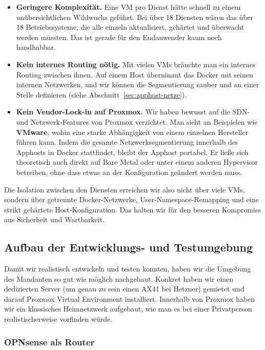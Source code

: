 \begin{itemize}
  \item \textbf{Geringere Komplexität.} Eine \ac{VM} pro Dienst hätte schnell zu
    einem unübersichtlichen Wildwuchs geführt. Bei über 18 Diensten wären
    das über 18 Betriebssysteme, die alle einzeln aktualisiert, gehärtet und
    überwacht werden müssten. Das ist gerade für den Endanwender kaum noch
    handhabbar.
  \item \textbf{Kein internes Routing nötig.} Mit vielen \acp{VM} bräuchte man ein
    internes Routing zwischen ihnen. Auf einem Host übernimmt das Docker mit
    seinen internen Netzwerken, und wir können die Segmentierung sauber und an
    einer Stelle definieren (siehe Abschnitt~\ref{sec:apphost-netze}).
  \item \textbf{Kein Vendor-Lock-in auf Proxmox.} Wir haben bewusst auf die
    \ac{SDN}- und Netzwerk-Features von Proxmox verzichtet. Man sieht an Beispielen
    wie \textbf{VMware}, wohin eine starke Abhängigkeit von einem einzelnen Hersteller
    führen kann. Indem die gesamte Netzwerksegmentierung innerhalb des Apphosts
    in Docker stattfindet, bleibt der Apphost portabel. Er ließe sich theoretisch
    auch direkt auf Bare Metal oder unter einem anderen Hypervisor betreiben, ohne
    dass etwas an der Konfiguration geändert werden muss.
\end{itemize}

Die Isolation zwischen den Diensten erreichen wir also nicht über viele \acp{VM},
sondern über getrennte Docker-Netzwerke, User-Namespace-Remapping und eine
strikt gehärtete Host-Konfiguration. Das halten wir für den besseren
Kompromiss aus Sicherheit und Wartbarkeit.

\subsection{Aufbau der Entwicklungs- und Testumgebung}

Damit wir realistisch entwickeln und testen konnten, haben wir die Umgebung des
Mandanten so gut wie möglich nachgebaut. Konkret haben wir einen dedizierten
Server (um genau zu sein einen AX41 bei Hetzner) gemietet und darauf Proxmox Virtual Environment installiert. Innerhalb von Proxmox haben wir ein klassisches Heimnetzwerk aufgebaut, wie man es bei
einer Privatperson realistischerweise vorfinden würde.

\subsubsection*{OPNsense als Router}

